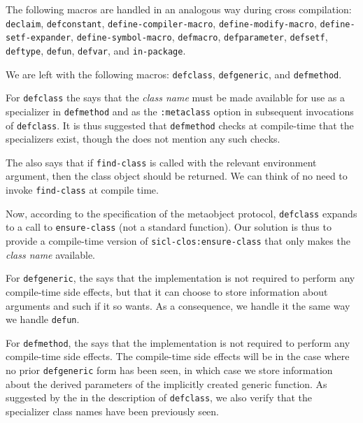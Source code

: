 The following macros are handled in an analogous way during cross
compilation: \texttt{declaim}, \texttt{defconstant},
\texttt{define-compiler-macro}, \texttt{define-modify-macro},
\texttt{define-setf-expander}, \texttt{define-symbol-macro},
\texttt{defmacro}, \texttt{defparameter}, \texttt{defsetf},
\texttt{deftype}, \texttt{defun}, \texttt{defvar}, and
\texttt{in-package}.

We are left with the following macros: \texttt{defclass}, 
\texttt{defgeneric}, and \texttt{defmethod}.

For \texttt{defclass} the \hs{} says that the \emph{class name} must
be made available for use as a specializer in \texttt{defmethod} and
as the \texttt{:metaclass} option in subsequent invocations of
\texttt{defclass}.  It is thus suggested that \texttt{defmethod}
checks at compile-time that the specializers exist, though the \hs{}
does not mention any such checks. 

The \hs{} also says that if \texttt{find-class} is called with the
relevant environment argument, then the class object should be
returned.  We can think of no need to invoke \texttt{find-class} at
compile time.

Now, according to the specification of the metaobject protocol,
\texttt{defclass} expands to a call to \texttt{ensure-class} (not a
standard \commonlisp{} function).  Our solution is thus to provide a
compile-time version of \texttt{sicl-clos:ensure-class} that only
makes the \emph{class name} available.

For \texttt{defgeneric}, the \hs{} says that the implementation is not
required to perform any compile-time side effects, but that it can
choose to store information about arguments and such if it so wants.
As a consequence, we handle it the same way we handle \texttt{defun}.

For \texttt{defmethod}, the \hs{} says that the implementation is not
required to perform any compile-time side effects.  The
compile-time side effects will be in the case where no prior
\texttt{defgeneric} form has been seen, in which case we store
information about the derived parameters of the implicitly created
generic function.  As suggested by the \hs{} in the description of
\texttt{defclass}, we also verify that the specializer class names
have been previously seen. 


